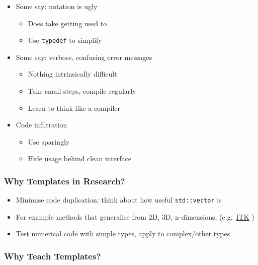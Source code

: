 \begin{itemize}
\tightlist
\item
  Some say: notation is ugly

  \begin{itemize}
  \tightlist
  \item
    Does take getting used to
  \item
    Use \texttt{typedef} to simplify
  \end{itemize}
\item
  Some say: verbose, confusing error messages

  \begin{itemize}
  \tightlist
  \item
    Nothing intrinsically difficult
  \item
    Take small steps, compile regularly
  \item
    Learn to think like a compiler
  \end{itemize}
\item
  Code infiltration

  \begin{itemize}
  \tightlist
  \item
    Use sparingly
  \item
    Hide usage behind clean interface
  \end{itemize}
\end{itemize}

\hypertarget{why-templates-in-research}{%
\subsubsection{Why Templates in
Research?}\label{why-templates-in-research}}

\begin{itemize}
\tightlist
\item
  Minimise code duplication: think about how useful \texttt{std::vector}
  is
\item
  For example methods that generalise from 2D, 3D, n-dimensions,
  (e.g.~\href{http://www.itk.org}{ITK} )
\item
  Test numerical code with simple types, apply to complex/other types
\end{itemize}

\hypertarget{why-teach-templates}{%
\subsubsection{Why Teach Templates?}\label{why-teach-templates}}

